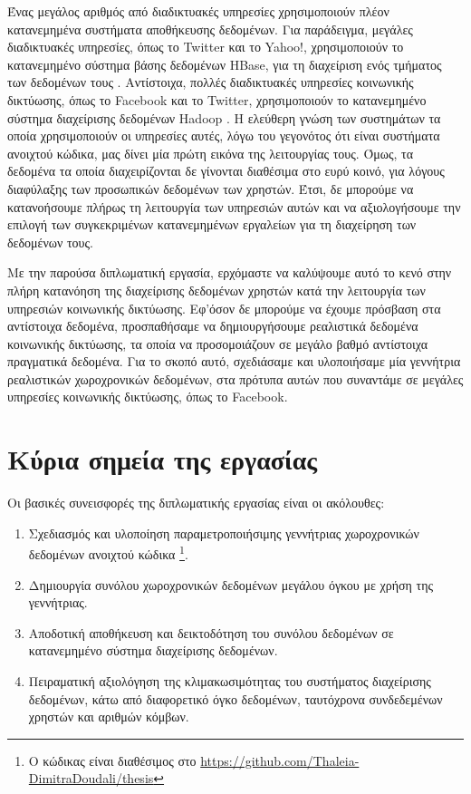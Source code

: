 Ένας μεγάλος αριθμός από διαδικτυακές υπηρεσίες χρησιμοποιούν πλέον κατανεμημένα \linebreak συστήματα αποθήκευσης δεδομένων. Για παράδειγμα, μεγάλες διαδικτυακές 
υπηρεσίες, όπως το Twitter και το Yahoo!, χρησιμοποιούν το κατανεμημένο σύστημα βάσης δεδομένων HBase, για τη διαχείριση 
ενός τμήματος των δεδομένων τους \cite{4}. Αντίστοιχα, πολλές διαδικτυακές υπηρεσίες κοινωνικής δικτύωσης, όπως το Facebook και το Twitter, 
χρησιμοποιούν το \linebreak κατανεμημένο σύστημα διαχείρισης δεδομένων Hadoop \cite{6}. Η ελεύθερη γνώση των \linebreak 
συστημάτων τα οποία χρησιμοποιούν οι 
υπηρεσίες αυτές, λόγω του γεγονότος ότι είναι συστήματα ανοιχτού κώδικα, μας δίνει μία πρώτη εικόνα της 
λειτουργίας τους. Όμως, τα δεδομένα τα οποία διαχειρίζονται δε γίνονται διαθέσιμα στο ευρύ κοινό, για λόγους 
διαφύλαξης των προσωπικών \linebreak δεδομένων των χρηστών. Έτσι, δε μπορούμε να κατανοήσουμε πλήρως τη λειτουργία των υπηρεσιών αυτών και να αξιολογήσουμε την επιλογή 
των συγκεκριμένων κατανεμημένων εργαλείων για τη διαχείρηση των δεδομένων τους. 

Με την παρούσα διπλωματική εργασία, ερχόμαστε να καλύψουμε αυτό το κενό στην πλήρη κατανόηση της διαχείρισης δεδομένων χρηστών κατά την λειτουργία των υπηρεσιών κοινωνικής δικτύωσης. 
Εφ'όσον δε μπορούμε να έχουμε πρόσβαση στα αντίστοιχα δεδομένα, προσπαθήσαμε να δημιουργήσουμε ρεαλιστικά 
δεδομένα κοινωνικής δικτύωσης, τα οποία να προσομοιάζουν 
σε μεγάλο βαθμό αντίστοιχα 
πραγματικά δεδομένα. Για το σκοπό αυτό, σχεδιάσαμε και υλοποιήσαμε μία γεννήτρια ρεαλιστικών χωροχρονικών δεδομένων, στα πρότυπα 
αυτών που συναντάμε σε μεγάλες υπηρεσίες κοινωνικής δικτύωσης, όπως το Facebook. 

\newpage

\section{Κύρια σημεία της εργασίας}

Οι βασικές συνεισφορές της διπλωματικής εργασίας είναι οι ακόλουθες:

\begin{enumerate}
 \item Σχεδιασμός και υλοποίηση παραμετροποιήσιμης γεννήτριας χωροχρονικών δεδομένων \linebreak ανοιχτού κώδικα \footnote{Ο κώδικας είναι διαθέσιμος στο 
 \url{https://github.com/Thaleia-DimitraDoudali/thesis}}.
 \item Δημιουργία συνόλου χωροχρονικών δεδομένων μεγάλου όγκου με χρήση της γεννήτριας.
 \item Αποδοτική αποθήκευση και δεικτοδότηση του συνόλου δεδομένων σε κατανεμημένο σύστημα διαχείρισης δεδομένων.
 \item Πειραματική αξιολόγηση της κλιμακωσιμότητας του συστήματος διαχείρισης δεδομένων, κάτω από διαφορετικό όγκο δεδομένων, ταυτόχρονα 
 συνδεδεμένων χρηστών και αριθμών κόμβων.
\end{enumerate}

